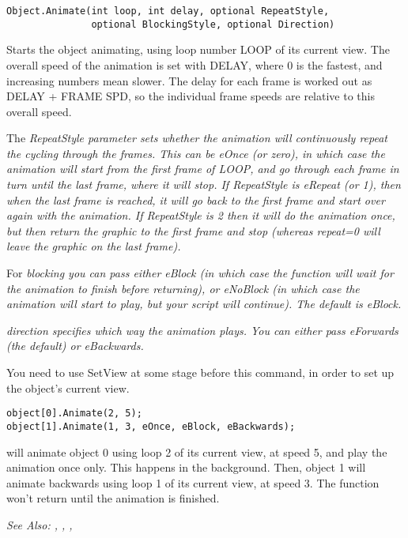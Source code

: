 \begin{verbatim}
Object.Animate(int loop, int delay, optional RepeatStyle,
               optional BlockingStyle, optional Direction)
\end{verbatim}
Starts the object animating, using loop number LOOP of its current view.
The overall speed of the animation is set with DELAY, where 0 is the
fastest, and increasing numbers mean slower. The delay for each frame
is worked out as DELAY + FRAME SPD, so the individual frame speeds are
relative to this overall speed.

The \it{RepeatStyle} parameter sets whether the animation will continuously repeat
the cycling through the frames. This can be \it{eOnce} (or zero), in which case the animation
will start from the first frame of LOOP, and go through each frame in turn until the
last frame, where it will stop. If RepeatStyle is \it{eRepeat} (or 1), then when the last frame
is reached, it will go back to the first frame and start over again with the animation.
If RepeatStyle is 2 then it will do the animation once, but then return
the graphic to the first frame and stop (whereas repeat=0 will leave the
graphic on the last frame).

For \it{blocking} you can pass either eBlock (in which case the function will wait
for the animation to finish before returning), or eNoBlock (in which case the animation
will start to play, but your script will continue). The default is eBlock.

\it{direction} specifies which way the animation plays. You can either pass eForwards (the
default) or eBackwards.

You need to use SetView at some stage before this command, in order to set up the object's
current view.

\begin{verbatim}
object[0].Animate(2, 5);
object[1].Animate(1, 3, eOnce, eBlock, eBackwards);
\end{verbatim}
will animate object 0 using loop 2 of its current view, at speed 5, and play the
animation once only. This happens in the background.
Then, object 1 will animate backwards using loop 1 of its current view, at speed 3. The
function won't return until the animation is finished.

\it{See Also:} ,
, ,


